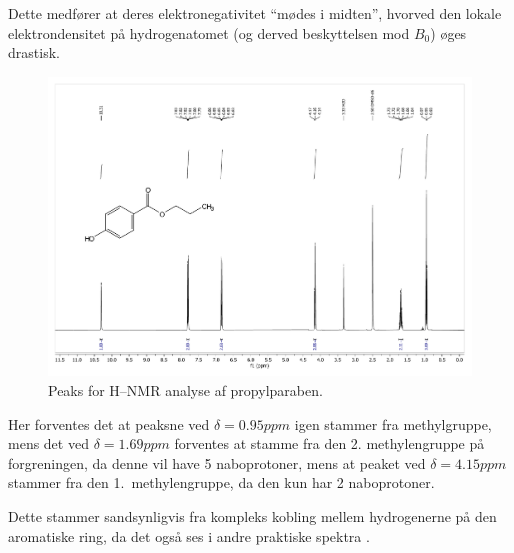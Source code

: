     Dette medfører at deres elektronegativitet ``mødes i midten'', hvorved den lokale elektrondensitet på hydrogenatomet (og derved beskyttelsen mod $B_0$) øges drastisk.
    \begin{figure}[H] \centering
        \includegraphics[width=\textwidth,page=2]{bilag/propylnmr}
        \caption{Peaks for H--NMR analyse af propylparaben.}
    \end{figure}
    Her forventes det at peaksne ved $\delta=0.95\si{ppm}$ igen stammer fra methylgruppe, mens det ved $\delta=1.69\si{ppm}$ forventes at stamme fra den 2. methylengruppe på forgreningen, da denne vil have 5 naboprotoner, mens at peaket ved $\delta=4.15\si{ppm}$ stammer fra den 1.\ methylengruppe, da den kun har 2 naboprotoner. 

    Dette stammer sandsynligvis fra kompleks kobling mellem hydrogenerne på den aromatiske ring, da det også ses i andre praktiske spektra \parencite{SDBS}.

